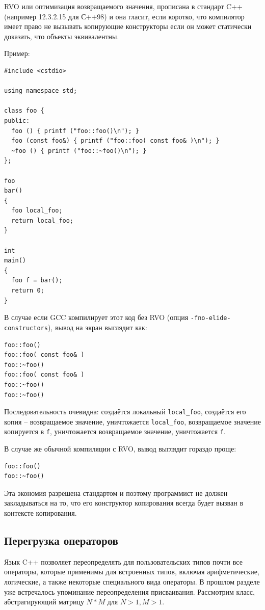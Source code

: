 \documentclass[a4paper,12pt,oneside]{article}
\begin{document}
RVO или оптимизация возвращаемого значения, прописана в стандарт C++ (например 12.3.2.15 для С++98) и она гласит, если коротко, что компилятор имеет право не вызывать копирующие конструкторы если он может статически доказать, что объекты эквивалентны.

Пример:

\begin{lstlisting}
#include <cstdio>

using namespace std;

class foo {
public:
  foo () { printf ("foo::foo()\n"); }
  foo (const foo&) { printf ("foo::foo( const foo& )\n"); }
  ~foo () { printf ("foo::~foo()\n"); }
};

foo
bar()
{
  foo local_foo;
  return local_foo;
}

int
main()
{
  foo f = bar();
  return 0;
}
\end{lstlisting}

В случае если GCC компилирует этот код без RVO (опция \lstinline!-fno-elide-constructors!), вывод на экран выглядит как:

\begin{lstlisting}
foo::foo()
foo::foo( const foo& )
foo::~foo()
foo::foo( const foo& )
foo::~foo()
foo::~foo()
\end{lstlisting}

Последовательность очевидна: создаётся локальный \lstinline!local_foo!, создаётся его копия -- возвращаемое значение, уничтожается \lstinline!local_foo!, возвращаемое значение копируется в \lstinline!f!, уничтожается возвращаемое значение, уничтожается \lstinline!f!.

В случае же обычной компиляции с RVO, вывод выглядит гораздо проще:

\begin{lstlisting}
foo::foo()
foo::~foo()
\end{lstlisting}

Эта экономия разрешена стандартом и поэтому программист не должен закладываться на то, что его конструктор копирования всегда будет вызван в контексте копирования.

\subsection{Перегрузка операторов}\label{OperatorOverloading}

Язык C++ позволяет переопределять для пользовательских типов почти все операторы, которые применимы для встроенных типов, включая арифметические, логические, а также некоторые специального вида операторы. В прошлом разделе уже встречалось упоминание переопределения присваивания. Рассмотрим класс, абстрагирующий матрицу $N*M$ для $N>1, M>1$.
\end{document}
